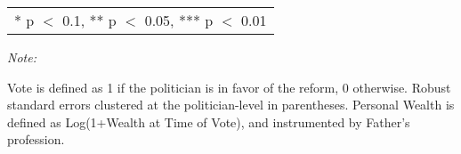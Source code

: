 \begin{table}[!h]
{\begin{threeparttable}
\begin{tabular}[t]{lcccccc}
\bottomrule
\multicolumn{7}{l}{\rule{0pt}{1em}* p $<$ 0.1, ** p $<$ 0.05, *** p $<$ 0.01}\\
\end{tabular}
\begin{tablenotes}[para]
\item \textit{Note: } 
\item Vote is defined as 1 if the politician is in favor of the reform, 0 otherwise. Robust standard errors clustered at the politician-level in parentheses. Personal Wealth is defined as Log(1+Wealth at Time of Vote), and instrumented by Father's profession.
\end{tablenotes}
\end{threeparttable}}
\end{table}
